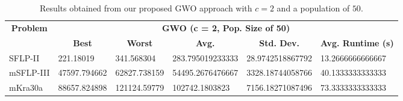 \begin{table}[h!]
	\begin{adjustwidth}{-1.18in}{}
		\centering
		\begin{tabular}{|l|l|l|l|l|l|}
			\hline
			\multicolumn{1}{|c|}{\multirow{2}{*}{\textbf{Problem}}} & \multicolumn{5}{c|}{\textbf{GWO (c = 2, Pop. Size of 50)}} \\ \cline{2-6} 
			\multicolumn{1}{|c|}{}                                  & \multicolumn{1}{c|}{\textbf{Best}} & \multicolumn{1}{c|}{\textbf{Worst}} & \multicolumn{1}{c|}{\textbf{Avg.}} & \multicolumn{1}{c|}{\textbf{Std. Dev.}} & \multicolumn{1}{c|}{\textbf{Avg. Runtime (s)}} \\ \hline
			SFLP-II                                                 & 221.18019                                  & 341.568304                                   & 283.795019233333                      & 28.9742518867792                                 & 13.2666666666667                                  \\ \hline
			mSFLP-III                                               & 47597.794662                                & 62827.738159                                 & 54495.2676476667						         & 3328.18744058766                              & 40.1333333333333                               \\ \hline
			mKra30a                                               & 88657.824898                                & 121124.59779                                 &
			102742.1803823							&
			7156.18271087496							&
			73.3333333333333						\\ \hline
		\end{tabular}
	\end{adjustwidth}
	\caption{Results obtained from our proposed GWO approach with $c = 2$ and a population of $50$.}
	\label{approach-gwo-c2-p50-results}
\end{table}

